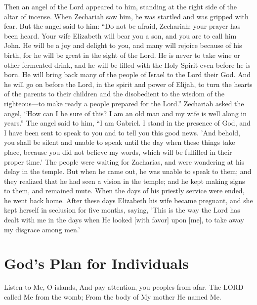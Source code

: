 \begin{scripture}[Luke 1:11-25]
    Then an angel of the Lord appeared to him, standing at the right side of the altar of incense.
    When Zechariah saw him, he was startled and was gripped with fear. 
    But the angel said to him: “Do not be afraid, Zechariah; your prayer has been heard. Your wife Elizabeth will bear you a son, and you are to call him John. 
    He will be a joy and delight to you, and many will rejoice because of his birth, 
    for he will be great in the sight of the Lord. He is never to take wine or other fermented drink, and he will be filled with the Holy Spirit even before he is born. 
    He will bring back many of the people of Israel to the Lord their God. 
    And he will go on before the Lord, in the spirit and power of Elijah, to turn the hearts of the parents to their children and the disobedient to the wisdom of the righteous—to make ready a people prepared for the Lord.”
    Zechariah asked the angel, “How can I be sure of this? I am an old man and my wife is well along in years.”
    The angel said to him, “I am Gabriel. I stand in the presence of God, and I have been sent to speak to you and to tell you this good news. 
    'And behold, you shall be silent and unable to speak until the day when these things take place, because you did not believe my words, which will be fulfilled in their proper time.'
    The people were waiting for Zacharias, and were wondering at his delay in the temple.
    But when he came out, he was unable to speak to them; and they realized that he had seen a vision in the temple; and he kept making signs to them, and remained mute.
    When the days of his priestly service were ended, he went back home.
    After these days Elizabeth his wife became pregnant, and she kept herself in seclusion for five months, saying,
    'This is the way the Lord has dealt with me in the days when He looked [with favor] upon [me], to take away my disgrace among men.'

\end{scripture}

\vspace{2\baselineskip}


\newpage

\section{God's Plan for Individuals}
\begin{scripture}[Isaiah 49:1]
    Listen to Me, O islands, And pay attention, you peoples from afar. The LORD called Me from the womb; From the body of My mother He named Me.
\end{scripture}

